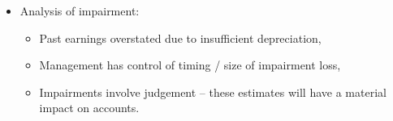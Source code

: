 \documentclass[../notes_compiled.tex]{subfiles}
\begin{document}
\begin{itemize}
\begin{multicols}{2}
\begin{itemize}
\item Income statement
\begin{itemize}
\item Decreases current net income (Impairment charge)
\item Increases future net income (Lower depreciation)
\end{itemize}

\item Cash flow
\begin{itemize}
\item Unaffected (Impairment is a non-cash charge)
\end{itemize}

\item Disclosure
\begin{itemize}
\item MD\&A, Footnotes
\end{itemize}

\item Fixed assets and turnover ratios
\begin{itemize}
\item Increase (Lower assets, therefore smaller denominator)
\end{itemize}

\item Debt-to-equity ratio
\begin{itemize}
\item Increase (Lower equity, as equity = $A - L$)
\end{itemize}

\item Current-year ROA, ROE $\left(\frac{\mathrm{NI}}{A}, \frac{\mathrm{NI}}{E}\right)$
\begin{itemize}
\item Decrease (\% fall in NI $>$ \% fall in $A$, $E$)
\end{itemize}

\item Future ROA, ROE
\begin{itemize}
\item Increase (Lower $A$, $E$, higher NI since reduced depreciation)
\item[]
\item[]
\end{itemize}
\end{itemize}
\end{multicols}


\item Analysis of impairment:
\begin{itemize}
\item Past earnings overstated due to insufficient depreciation,
\item Management has control of timing / size of impairment loss,
\item Impairments involve judgement -- these estimates will have a material impact on accounts.
\end{itemize}


\end{itemize}
\end{document}
